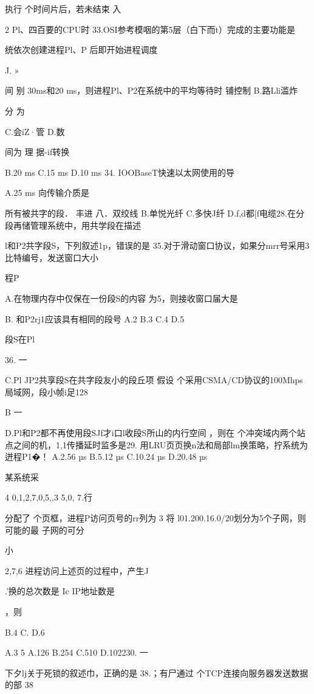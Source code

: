 {   执行 个时间片后，若未结束    入

    2    Pl、四百要的CPU时    33.OSI参考模咽的第5层（白下而t）完成的主要功能是

   统依次创建进程Pl、P 后即开始进程调度

    J. »

   间  别   30ms和20 ms，则进程Pl、P2在系统中的平均等待时    铺控制    B.路Lli滥炸

    分  为

    C.会iZ·管    D.数

   间为    理    据-if转换

    B.20 ms    C.15 ms    D.10 ms    34. IOOBaseT快速以太网使用的导

   A.25 ms    向传输介质是

    所有被共字的段． 丰进    八．双绞线    B.单悦光纤    C.多快J纤   D.f,d都[f电缆28.在分段再储管理系统中，用共学段在描述

    l和P2共字段S，下列叙述1p，错误的是    35.对于滑动窗口协议，如果分mrr号采用3 比特编号，发送窗口大小

   程P

   A.在物理内存中仅保在一份段S的内容    为5，则接收窗口届大是

   B.    和P2rj1应该具有相同的段号    A.2    B.3    C.4    D.5

    段S在Pl

    36.    一

   C.Pl JP2共享段S在共字段友小的段丘项    假设  个采用CSMA/CD协议的100Mhps局域网，段小帧i足128

    B    一

   D.Pl和P2都不再使用段SJf才i口l收段S所山的内行空间    ，则在  个冲突域内两个站点之间的机，1,1传播延时监多是29.    用LRU页页换n法和局部lm换策略，拧系统为迸程P1�！    A.2.56 µs    B.5.12 µs    C.10.24 µs   D.20.48 µs

   某系统采

    4    0,1,2,7,0,5,,3 5,0,    7.行

   分配了  个页框，进程P访问页号的rr列为    3    将 l01.200.16.0/20划分为5个子网，则可能的最  子网的可分

    小

   2,7,6   进程访问上述页的过程中，产生J{.'换的总次数是    Ic IP地址数是

    ，则

    B.4    C.    D.6

    A.3    5    A.126    B.254    C.510    D.102230.    一

   下夕lj关于死锁的叙述巾，正确的是    38.；有尸通过  个TCP连接向服务器发送数据的部    38

}}
